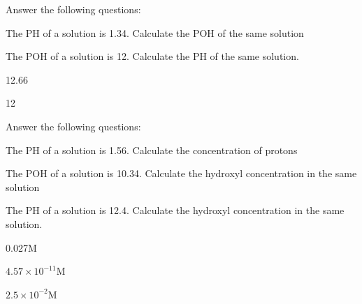 \documentclass[main.tex]{subfiles}
\begin{document}
\begin{multicols*}{2}
\begin{question}[ID=\the\value{numA}]
Answer the following questions:
\begin{inparaenum}[(a)]
\item  The PH of a solution is 1.34. Calculate the POH of the same solution %
\item  The POH of a solution is 12. Calculate the PH of the same solution.%
 \end{inparaenum}
\end{question}
\begin{solution}
\begin{inparaenum}[(a)]
\item   12.66
\item   12
 \end{inparaenum}
\hspace{0.1cm}\end{solution}%

\begin{question}[ID=\the\value{numA}]
Answer the following questions:
\begin{inparaenum}[(a)]
\item  The PH of a solution is 1.56. Calculate the concentration of protons%
\item  The POH of a solution is 10.34. Calculate the hydroxyl concentration in the same solution%
\item  The PH of a solution is 12.4. Calculate the hydroxyl concentration in the same solution.%
 \end{inparaenum}
\end{question}
\begin{solution}
\begin{inparaenum}[(a)]
\item   0.027M
\item   $4.57\times 10^{-11}$M
\item   $2.5\times 10^{-2}$M
 \end{inparaenum}
\hspace{0.1cm}\end{solution}%



\end{multicols*}
\end{document}

